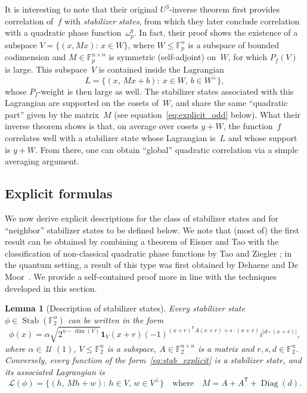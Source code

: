 \documentclass[11pt]{amsart}
\DeclareMathOperator{\Stab}{Stab}\DeclareMathOperator{\Spec}{Spec}
\newcommand{\F}{\mathbb{F}} %
\newcommand{\Lcal}{\mathcal{L}}
\newcommand{\one}{\mathbf{1}}
\DeclareMathOperator{\U}{\mathcal{U}}
\DeclareMathOperator{\Diag}{Diag}
\newcommand{\tp}{\mathsf{T}}
\theoremstyle{plain}
\newtheorem{lemma}[theorem]{Lemma}
\theoremstyle{definition}
\theoremstyle{remark}
\begin{document}
It is interesting to note that their original $U^3$-inverse theorem \cite[Theorem~2.3]{GreenTao2008} first provides correlation of~$f$ with \emph{stabilizer states}, from which they later conclude correlation with a quadratic phase function~$\omega_p^q$.
In fact, their proof shows the existence of a subspace $V = \{(x, Mx):\, x\in W\}$, where $W\leq \F_p^n$ is a subspace of bounded codimension and $M\in \F_p^{n\times n}$ is symmetric (self-adjoint) on~$W$, for which $P_f(V)$ is large.
This subspace~$V$ is contained inside the Lagrangian
$$L = \big\{(x,\, Mx+b):\: x\in W,\, b\in W^{\perp}\big\},$$
whose $P_f$-weight is then large as well.
The stabilizer states associated with this Lagrangian are supported on the cosets of~$W$, and share the same ``quadratic part'' given by the matrix~$M$ (see equation~\eqref{eq:explicit_odd} below).
What their inverse theorem shows is that, on average over cosets $y+W$, the function~$f$ correlates well with a stabilizer state whose Lagrangian is~$L$ and whose support is $y+W$.
From there, one can obtain ``global'' quadratic correlation via a simple averaging argument.


\subsection{Explicit formulas}

We now derive explicit descriptions for the class of stabilizer states and for ``neighbor'' stabilizer states to be defined below.
We note that (most of) the first result can be obtained by combining a theorem of Eisner and Tao \cite[Theorem~1.4]{eisner2012large} with the classification of non-classical quadratic phase functions by Tao and Ziegler \cite[Lemma~1.7]{TaoZiegler2012};
in the quantum setting, a result of this type was first obtained by Dehaene and De Moor~\cite{dehaene2003clifford}.
We provide a self-contained proof more in line with the techniques developed in this section.

\begin{lemma}[Description of stabilizer states] \label{lem:stab_explicit}
    Every stabilizer state $\phi \in \Stab(\F_2^n)$ can be written in the form
    \begin{equation} \label{eq:stab_explicit}
        \phi(x) = \alpha \sqrt{2^{n-\dim(V)}} \one_V(x+r) (-1)^{(x+r)^\tp A(x+r) + s\cdot(x+r)} i^{|d\circ (x+r)|},
    \end{equation}
    where $\alpha\in \U(1)$, $V\leq \F_2^n$ is a subspace, $A\in \F_2^{n\times n}$ is a matrix and $r, s , d \in \F_2^n$.
    Conversely, every function of the form~\eqref{eq:stab_explicit} is a stabilizer state, and its associated Lagrangian is
    \begin{equation} \label{eq:Lagrangian_explicit}
        \Lcal(\phi) = \big\{(h,\, Mh+w):\: h\in V,\, w\in V^\perp\big\} \quad \text{where} \quad M = A+A^\tp+\Diag(d).
    \end{equation}
\end{lemma}
\end{document}
